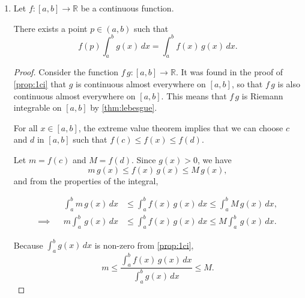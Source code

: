 \begin{enumerate}
\begin{enumerate}
\begin{enumerate}
                        \bigskip

                    \item Let $f: [a, b] \to \mathbb{R}$ be a continuous function.

                        \medskip

                        \begin{proposition} \label{prop:1cii}
                            There exists a point $p \in (a, b)$ such that
                            \[
                                f(p) \int_a^b g(x) \, dx = \int_a^b f(x) \, g(x) \, dx.
                            \]
                        \end{proposition}

                        \smallskip

                        \begin{proof}
                            Consider the function $f \, g: [a, b] \to \mathbb{R}$.
                            It was found in the proof of \cref{prop:1ci} that $g$ is continuous almost everywhere on $[a, b]$, so that $f \, g$ is also continuous almost everywhere on $[a, b]$.
                            This means that $f \, g$ is Riemann integrable on $[a, b]$ by \cref{thm:lebesgue}.

                            For all $x \in [a, b]$, the extreme value theorem implies that we can choose $c$ and $d$ in $[a, b]$ such that $f(c) \le f(x) \le f(d)$.

                            Let $m = f(c)$ and $M = f(d)$. Since $g(x) > 0$, we have
                            \[ m \, g(x) \le f(x) \, g(x) \le M \, g(x), \]
                            and from the properties of the integral,
                            \begin{spreadlines}{\baselineskip}
                                \begin{align*}
                                    && \int_a^b m \, g(x) \, dx &\le \int_a^b f(x) \, g(x) \, dx \le \int_a^b M \, g(x) \, dx, \\
                                    \implies && m \int_a^b \, g(x) \, dx &\le \int_a^b f(x) \, g(x) \, dx \le M \int_a^b \, g(x) \, dx.
                                \end{align*}
                            \end{spreadlines}
                            Because $\int_a^b g(x) \, dx$ is non-zero from \cref{prop:1ci},
                            \[
                                m \le \frac{\int_a^b f(x) \, g(x) \, dx}{\int_a^b g(x) \, dx} \le M.
                            \]


\end{proof}
\end{enumerate}
\end{enumerate}
\end{enumerate}
